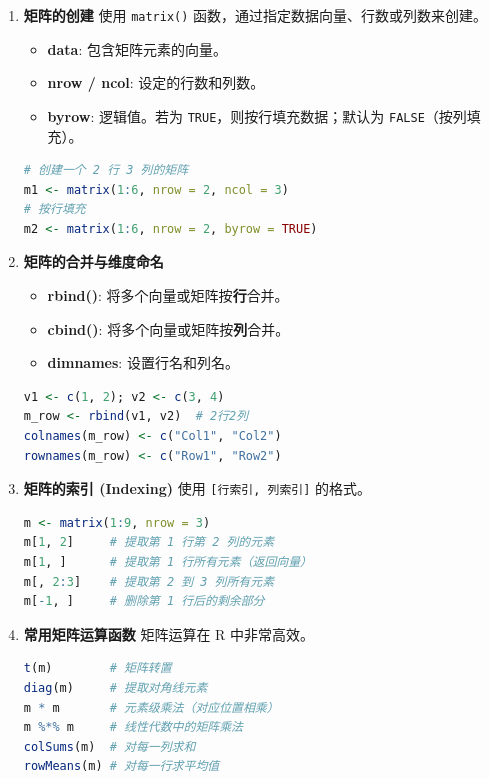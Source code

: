 \begin{enumerate}[label=\arabic*., leftmargin=2em]
    \item \textbf{矩阵的创建}
    使用 \texttt{matrix()} 函数，通过指定数据向量、行数或列数来创建。
    \begin{itemize}
        \item \textbf{data}: 包含矩阵元素的向量。
        \item \textbf{nrow / ncol}: 设定的行数和列数。
        \item \textbf{byrow}: 逻辑值。若为 \texttt{TRUE}，则按行填充数据；默认为 \texttt{FALSE}（按列填充）。
    \end{itemize}
\begin{lstlisting}[language=R]
# 创建一个 2 行 3 列的矩阵
m1 <- matrix(1:6, nrow = 2, ncol = 3)
# 按行填充
m2 <- matrix(1:6, nrow = 2, byrow = TRUE)
\end{lstlisting}

    \item \textbf{矩阵的合并与维度命名}
    \begin{itemize}
        \item \textbf{rbind()}: 将多个向量或矩阵按\textbf{行}合并。
        \item \textbf{cbind()}: 将多个向量或矩阵按\textbf{列}合并。
        \item \textbf{dimnames}: 设置行名和列名。
    \end{itemize}
\begin{lstlisting}[language=R]
v1 <- c(1, 2); v2 <- c(3, 4)
m_row <- rbind(v1, v2)  # 2行2列
colnames(m_row) <- c("Col1", "Col2")
rownames(m_row) <- c("Row1", "Row2")
\end{lstlisting}

    \item \textbf{矩阵的索引 (Indexing)}
    使用 \texttt{[行索引, 列索引]} 的格式。
\begin{lstlisting}[language=R]
m <- matrix(1:9, nrow = 3)
m[1, 2]     # 提取第 1 行第 2 列的元素
m[1, ]      # 提取第 1 行所有元素（返回向量）
m[, 2:3]    # 提取第 2 到 3 列所有元素
m[-1, ]     # 删除第 1 行后的剩余部分
\end{lstlisting}

    \item \textbf{常用矩阵运算函数}
    矩阵运算在 R 中非常高效。
\begin{lstlisting}[language=R]
t(m)        # 矩阵转置
diag(m)     # 提取对角线元素
m * m       # 元素级乘法（对应位置相乘）
m %*% m     # 线性代数中的矩阵乘法
colSums(m)  # 对每一列求和
rowMeans(m) # 对每一行求平均值
\end{lstlisting}
\end{enumerate}



